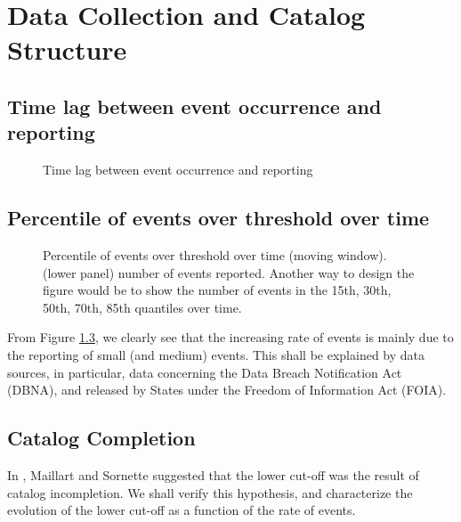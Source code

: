 
\vspace{1cm}


\section{Data Collection and Catalog Structure}

\subsection{Time lag between event occurrence and reporting}

\begin{figure}[h]
\begin{center}
\caption{Time lag between event occurrence and reporting}
\label{ }
\end{center}
\end{figure}

\subsection{Percentile of events over threshold over time}

\begin{figure}[h]
\begin{center}
\caption{Percentile of events over threshold over time (moving window). (lower panel) number of events reported. Another way to design the figure would be to show the number of events in the 15th, 30th, 50th, 70th, 85th quantiles over time.}
\label{ }
\end{center}
\end{figure}

From Figure \ref{}, we clearly see that the increasing rate of events is mainly due to the reporting of small (and medium) events. This shall be explained by data sources, in particular, data concerning the Data Breach Notification Act (DBNA), and released by States under the Freedom of Information Act (FOIA).


\subsection{Catalog Completion}

In \cite{},  Maillart and Sornette suggested that the lower cut-off was the result of catalog incompletion. We shall verify this hypothesis, and characterize the evolution of the lower cut-off as a function of the rate of events.



